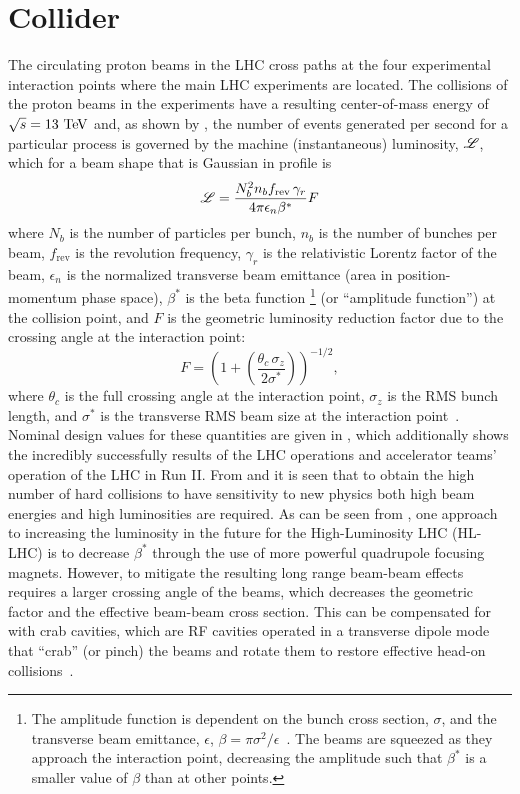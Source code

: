 \section{Collider}\label{section:LHC_collider}

The circulating proton beams in the LHC cross paths at the four experimental interaction points where the main LHC experiments are located.
The collisions of the proton beams in the experiments have a resulting center-of-mass energy of $\sqrt{s} = 13~\text{Te\kern-0.1em V}$ and, as shown by , the number of events generated per second for a particular process is governed by the machine (instantaneous) luminosity, $\mathscr{L}$, which for a beam shape that is Gaussian in profile is
\begin{equation}
 \mathscr{L} = \frac{N_{b}^{2} n_{b} f_{\mathrm{rev}} \,\gamma_{r}}{4 \pi \epsilon_{n} \beta^{*}} F
 \label{eq:machine_luminosity}
\end{equation}
where $N_{b}$ is the number of particles per bunch, $n_{b}$ is the number of bunches per beam, $f_{\mathrm{rev}}$ is the revolution frequency, $\gamma_{r}$ is the relativistic Lorentz factor of the beam, $\epsilon_{n}$ is the normalized transverse beam emittance (area in position-momentum phase space), $\beta^{*}$ is the beta function%
\footnote{The amplitude function is dependent on the bunch cross section, $\sigma$, and the transverse beam emittance, $\epsilon$, $\beta = \pi \sigma^{2}/\epsilon$~\cite{PDG2018:Ch30}.
 The beams are squeezed as they approach the interaction point, decreasing the amplitude such that $\beta^{*}$ is a smaller value of $\beta$ than at other points.}
(or ``amplitude function'') at the collision point, and $F$ is the geometric luminosity reduction factor due to the crossing angle at the interaction point:
\[
 F = \left(1 + \left(\frac{\theta_{c} \,\sigma_{z}}{2 \sigma^{*}}\right)\right)^{-1/2},
\]
where $\theta_{c}$ is the full crossing angle at the interaction point, $\sigma_{z}$ is the RMS bunch length, and $\sigma^{*}$ is the transverse RMS beam size at the interaction point~\cite{Evans:2008}.
Nominal design values for these quantities are given in , which additionally shows the incredibly successfully results of the LHC operations and accelerator teams' operation of the LHC in Run II.
From  and  it is seen that to obtain the high number of hard collisions to have sensitivity to new physics both high beam energies and high luminosities are required.
As can be seen from , one approach to increasing the luminosity in the future for the High-Luminosity LHC (HL-LHC) is to decrease $\beta^{*}$ through the use of more powerful quadrupole focusing magnets.
However, to mitigate the resulting long range beam-beam effects requires a larger crossing angle of the beams, which decreases the geometric factor and the effective beam-beam cross section.
This can be compensated for with crab cavities, which are RF cavities operated in a transverse dipole mode that ``crab'' (or pinch) the beams and rotate them to restore effective head-on collisions~\cite{PhysRevSTAB.12.101002,PhysRevAccelBeams.19.101003}.

